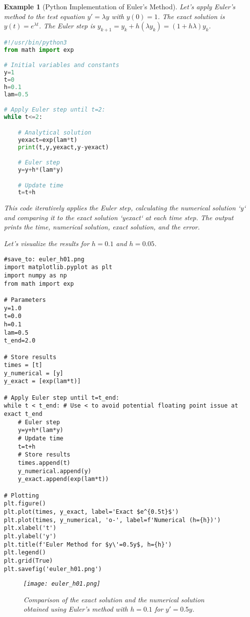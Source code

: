 \documentclass{article}
\newtheorem{example}{Example}
\begin{document}
\begin{example}[Python Implementation of Euler's Method]
Let's apply Euler's method to the test equation $y' = \lambda y$ with $y(0) = 1$. The exact solution is $y(t) = e^{\lambda t}$. The Euler step is $y_{k+1} = y_k + h (\lambda y_k) = (1 + h\lambda) y_k$.

\begin{lstlisting}[language=Python, breaklines=true, caption={Python code (\texttt{euler.py}) implementing Forward Euler for $y' = \lambda y$.}, label=lst:euler_py]
#!/usr/bin/python3
from math import exp

# Initial variables and constants
y=1
t=0
h=0.1
lam=0.5

# Apply Euler step until t=2:
while t<=2:

    # Analytical solution
    yexact=exp(lam*t)
    print(t,y,yexact,y-yexact)

    # Euler step
    y=y+h*(lam*y)

    # Update time
    t=t+h
\end{lstlisting}

This code iteratively applies the Euler step, calculating the numerical solution `y` and comparing it to the exact solution `yexact` at each time step. The output prints the time, numerical solution, exact solution, and the error.

Let's visualize the results for $h=0.1$ and $h=0.05$.

\begin{verbatim}
#save_to: euler_h01.png
import matplotlib.pyplot as plt
import numpy as np
from math import exp

# Parameters
y=1.0
t=0.0
h=0.1
lam=0.5
t_end=2.0

# Store results
times = [t]
y_numerical = [y]
y_exact = [exp(lam*t)]

# Apply Euler step until t=t_end:
while t < t_end: # Use < to avoid potential floating point issue at exact t_end
    # Euler step
    y=y+h*(lam*y)
    # Update time
    t=t+h
    # Store results
    times.append(t)
    y_numerical.append(y)
    y_exact.append(exp(lam*t))

# Plotting
plt.figure()
plt.plot(times, y_exact, label='Exact $e^{0.5t}$')
plt.plot(times, y_numerical, 'o-', label=f'Numerical (h={h})')
plt.xlabel('t')
plt.ylabel('y')
plt.title(f'Euler Method for $y\'=0.5y$, h={h}')
plt.legend()
plt.grid(True)
plt.savefig('euler_h01.png')
\end{verbatim}

\begin{figure}[h]
    \centering
    \texttt{[image: euler\_h01.png]}
    \caption{Comparison of the exact solution and the numerical solution obtained using Euler's method with $h=0.1$ for $y' = 0.5y$.}
    \label{fig:euler_h01}
\end{figure}


\end{example}
\end{document}
